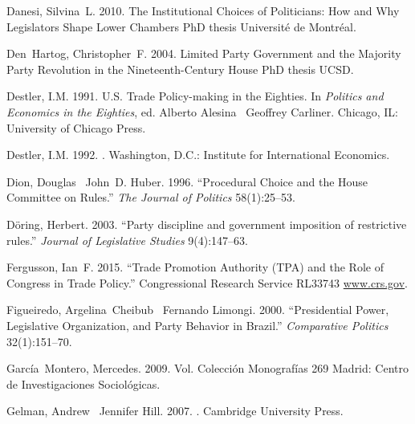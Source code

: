 \documentclass[letter,12pt]{article}
\begin{document}
\begin{thebibliography}{xx}
Danesi, Silvina~L. 2010.
\newblock The Institutional Choices of Politicians: How and Why Legislators
  Shape Lower Chambers PhD thesis Universit\'e de Montr\'eal.

Den~Hartog, Christopher~F. 2004.
\newblock Limited Party Government and the Majority Party Revolution in the
  Nineteenth-Century {H}ouse PhD thesis UCSD.

Destler, I.M. 1991.
\newblock U.S. Trade Policy-making in the Eighties.  In {\em Politics and
  Economics in the Eighties}, ed. Alberto Alesina \harvardand\ Geoffrey
  Carliner.
\newblock Chicago, IL:  University of Chicago Press.

Destler, I.M. 1992.
.
\newblock Washington, D.C.:  Institute for International Economics.

Dion, Douglas \harvardand\ John~D. Huber. 1996.
\newblock ``Procedural Choice and the {H}ouse Committee on Rules.'' {\em The
  Journal of Politics} 58(1):25--53.

D{\"o}ring, Herbert. 2003.
\newblock ``Party discipline and government imposition of restrictive rules.''
  {\em Journal of Legislative Studies} 9(4):147--63.

Fergusson, Ian~F. 2015.
\newblock ``Trade Promotion Authority (TPA) and the Role of Congress in Trade
  Policy.'' Congressional Research Service RL33743 \url{www.crs.gov}.

Figueiredo, Argelina~Cheibub \harvardand\ Fernando Limongi. 2000.
\newblock ``Presidential Power, Legislative Organization, and Party Behavior in
  Brazil.'' {\em Comparative Politics} 32(1):151--70.

Garc\'ia~Montero, Mercedes. 2009.
\newblock Vol. Colecci\'on Monograf\'ias 269 Madrid:  Centro de Investigaciones
  Sociol\'ogicas.

Gelman, Andrew \harvardand\ Jennifer Hill. 2007.
.
\newblock Cambridge University Press.


\end{thebibliography}
\end{document}
